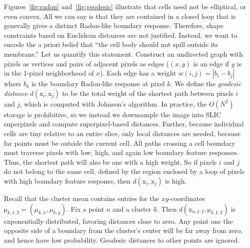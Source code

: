 \documentclass[english]{article}
\newcommand{\+}[1]{\ensuremath{\boldsymbol{\mathrm{#1}}}}
\begin{document}
Figures~\ref{fig:radon} and~\ref{fig:geodesic} illustrate that cells need not be elliptical, or even convex. All we can say is that they are contained in a closed loop that is generally gives a distinct Radon-like boundary response. Therefore, shape constraints based on Euclidean distances are not justified. Instead, we want to encode the a priori belief that ``the cell body should not spill outside its membrane.'' Let us quantify this statement. Construct an undirected graph with pixels as vertices and pairs of adjacent pixels as edges ($(x,y)$ is an edge if $y$ is in the 1-pixel neighborhood of $x$). Each edge has a weight $w(i,j) = \left| b_i - b_j \right|$ where $b_k$ is the boundary Radon-like response at pixel $k$. We define the \emph{geodesic distance} $d(\+{x}_i, \+{x}_j)$ to be the total weight of the shortest path between pixels $i$ and $j$, which is computed with Johnson's algorithm. In practice, the $O(N^2)$ storage is prohibitive, so we instead we downsample the image into SLIC superpixels \cite{Achanta2012} and compute superpixel-based distances. Further, because individual cells are tiny relative to an entire slice, only local distances are needed, because far points must be outside the current cell. All paths crossing a cell boundary must traverse pixels with low, high, and again low boundary feature responses. Thus, the shortest path will also be one with a high weight. So if pixels $i$ and $j$ do not belong to the same cell, defined by the region enclosed by a loop of pixels with high boundary feature response, then $d(\+{x}_i, \+{x}_j)$ is high.

Recall that the cluster mean contains entries for the $xy$-coordinates $\+{\mu}_{k,1:2} = (\mu_{k,x}, \mu_{k,y})$. Fix a point $n$ and a cluster $k$. Then $d(\+{x}_{n,1:2}, \+{\mu}_{k,1:2})$ is exponentially distributed, favoring distances close to zero. Any point one the opposite side of a boundary from the cluster's center will be far away from zero, and hence have low probability. Geodesic distances to other points are ignored.
\end{document}
